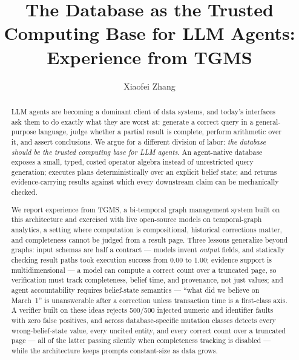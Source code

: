 \documentclass[sigconf]{acmart}
\begin{document}
\title{The Database as the Trusted Computing Base for LLM Agents:\\
Experience from TGMS}

\author{Xiaofei Zhang}

\begin{abstract}
LLM agents are becoming a dominant client of data systems, and today's
interfaces ask them to do exactly what they are worst at: generate a
correct query in a general-purpose language, judge whether a partial
result is complete, perform arithmetic over it, and assert conclusions.
We argue for a different division of labor: \emph{the database should be
the trusted computing base for LLM agents}. An agent-native database
exposes a small, typed, costed operator algebra instead of unrestricted
query generation; executes plans deterministically over an explicit
belief state; and returns evidence-carrying results against which every
downstream claim can be mechanically checked.

We report experience from TGMS, a bi-temporal graph management system
built on this architecture and exercised with live open-source models on
temporal-graph analytics, a setting where computation is compositional,
historical corrections matter, and completeness cannot be judged from a
result page. Three lessons generalize beyond graphs: input schemas are
half a contract --- models invent \emph{output} fields, and statically
checking result paths took execution success from 0.00 to 1.00; evidence
support is multidimensional --- a model can compute a correct count over
a truncated page, so verification must track completeness, belief time,
and provenance, not just values; and agent accountability requires
belief-state semantics --- ``what did we believe on March~1'' is
unanswerable after a correction unless transaction time is a first-class
axis. A verifier built on these ideas rejects
500/500 injected numeric and identifier faults with zero false
positives, and across database-specific mutation classes detects every
wrong-belief-state value, every uncited entity, and every correct count
over a truncated page --- all of the latter passing silently when
completeness tracking is disabled --- while the architecture keeps
prompts constant-size as data grows.
\end{abstract}

\maketitle
\end{document}
